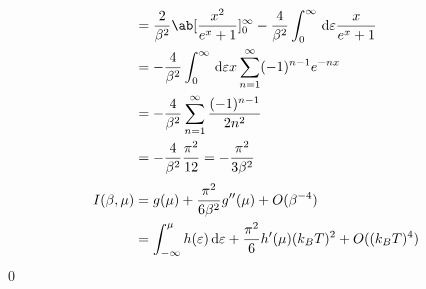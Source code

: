 \documentclass[uplatex,diffipdfmx,a4paper,11pt]{jlreq}
\makeatletter
\theoremstyle{definition}
\renewenvironment{proof}[1][\proofname]{\par
  \normalfont
  \topsep6\p@\@plus6\p@ \trivlist
  \item[\hskip\labelsep{\bfseries #1}\@addpunct{\bfseries}]\ignorespaces\quad\par
}{%
  \qed\endtrivlist\@endpefalse
}
\renewcommand\proofname{証明}
\makeatother
\begin{document}
\begin{proof}
\begin{align}
                                                                                  & = \frac{2}{\beta^2}\ab[\frac{x^2}{e^x + 1}]_{0}^{\infty} - \frac{4}{\beta^2}\int_{0}^{\infty}\dl{\varepsilon}\frac{x}{e^x + 1}                                      \\
                                                                                  & = - \frac{4}{\beta^2}\int_{0}^{\infty}\dl{\varepsilon}x\sum_{n=1}^{\infty}(-1)^{n-1}e^{-nx}                                                                         \\
                                                                                  & = - \frac{4}{\beta^2}\sum_{n=1}^{\infty}\frac{(-1)^{n-1}}{2n^2}                                                                                                     \\
                                                                                  & = - \frac{4}{\beta^2}\frac{\pi^2}{12} = -\frac{\pi^2}{3\beta^2}
  \end{align}
  \begin{align}
    I(\beta, \mu) & = g(\mu) + \frac{\pi^2}{6\beta^2}g''(\mu) + O(\beta^{-4})                                            \\
                  & = \int_{-\infty}^\mu h(\varepsilon)\dl{\varepsilon} + \frac{\pi^2}{6}h'(\mu)(k_BT)^2 + O((k_BT)^{4})
  \end{align}
\end{proof}
\end{document}
